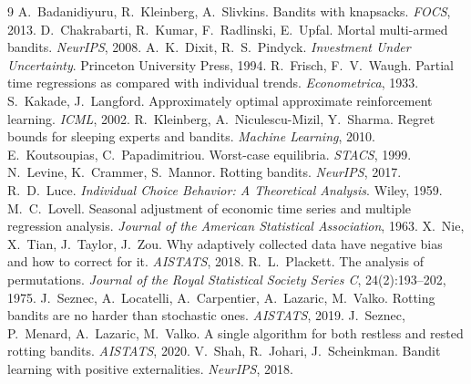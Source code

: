 \begin{thebibliography}{9}
 A.~Badanidiyuru, R.~Kleinberg, A.~Slivkins.
  Bandits with knapsacks. \emph{FOCS}, 2013.
 D.~Chakrabarti, R.~Kumar, F.~Radlinski, E.~Upfal.
  Mortal multi-armed bandits. \emph{NeurIPS}, 2008.
 A.~K.~Dixit, R.~S.~Pindyck.
  \emph{Investment Under Uncertainty}. Princeton University Press, 1994.
 R.~Frisch, F.~V.~Waugh.
  Partial time regressions as compared with individual trends.
  \emph{Econometrica}, 1933.
 S.~Kakade, J.~Langford.
  Approximately optimal approximate reinforcement learning. \emph{ICML}, 2002.
 R.~Kleinberg, A.~Niculescu-Mizil, Y.~Sharma.
  Regret bounds for sleeping experts and bandits. \emph{Machine Learning}, 2010.
 E.~Koutsoupias, C.~Papadimitriou.
  Worst-case equilibria. \emph{STACS}, 1999.
 N.~Levine, K.~Crammer, S.~Mannor.
  Rotting bandits. \emph{NeurIPS}, 2017.
 R.~D.~Luce.
  \emph{Individual Choice Behavior: A Theoretical Analysis}. Wiley, 1959.
 M.~C.~Lovell.
  Seasonal adjustment of economic time series and multiple regression analysis.
  \emph{Journal of the American Statistical Association}, 1963.
 X.~Nie, X.~Tian, J.~Taylor, J.~Zou.
  Why adaptively collected data have negative bias and how to correct for it.
  \emph{AISTATS}, 2018.
 R.~L.~Plackett.
  The analysis of permutations. \emph{Journal of the Royal Statistical
  Society Series C}, 24(2):193--202, 1975.
 J.~Seznec, A.~Locatelli, A.~Carpentier, A.~Lazaric,
  M.~Valko. Rotting bandits are no harder than stochastic ones.
  \emph{AISTATS}, 2019.
 J.~Seznec, P.~Menard, A.~Lazaric, M.~Valko.
  A single algorithm for both restless and rested rotting bandits.
  \emph{AISTATS}, 2020.
 V.~Shah, R.~Johari, J.~Scheinkman.
  Bandit learning with positive externalities. \emph{NeurIPS}, 2018.
\end{thebibliography}

